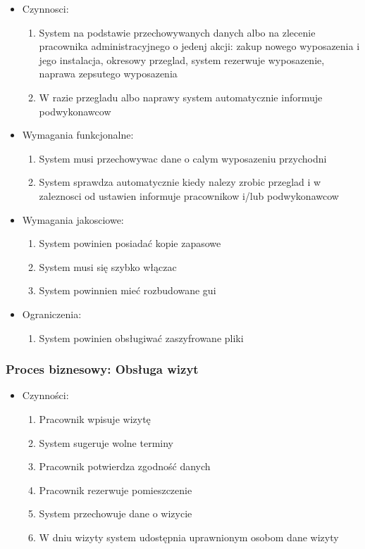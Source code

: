 \documentclass{article}
\begin{document}
\begin{itemize}
	\item Czynnosci:
		\begin{enumerate}
			\item System na podstawie przechowywanych danych albo na zlecenie pracownika administracyjnego o jedenj akcji: zakup nowego wyposazenia i jego instalacja, okresowy przeglad, system rezerwuje wyposazenie, naprawa zepsutego wyposazenia
			\item W razie przegladu albo naprawy system automatycznie informuje podwykonawcow
		\end{enumerate}
	\item Wymagania funkcjonalne: 
		\begin{enumerate}
			\item System musi przechowywac dane o calym wyposazeniu przychodni
			\item System sprawdza automatycznie kiedy nalezy zrobic przeglad i w zaleznosci od ustawien informuje pracownikow i/lub podwykonawcow 
		\end{enumerate}
	\item Wymagania jakosciowe:
		\begin{enumerate}
			\item System powinien posiadać kopie zapasowe
			\item System musi się szybko włączac 
			\item System powinnien mieć rozbudowane gui
		\end{enumerate}
	\item Ograniczenia:
		\begin{enumerate}
			\item System powinien obsługiwać zaszyfrowane pliki 
		\end{enumerate}
\end{itemize}
\subsubsection*{Proces biznesowy: Obsługa wizyt}
	\begin{itemize}
		\item Czynności:
		\begin{enumerate}
			\item Pracownik wpisuje wizytę
			\item System sugeruje wolne terminy
			\item Pracownik potwierdza zgodność danych
			\item Pracownik rezerwuje pomieszczenie
			\item System przechowuje dane o wizycie
			\item W dniu wizyty system udostępnia uprawnionym osobom dane wizyty
		\end{enumerate}
	\end{itemize}
\end{document}
